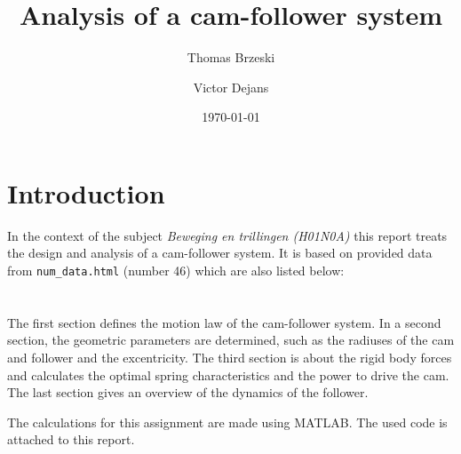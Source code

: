 \documentclass[a4paper]{article}
\date{\today}
\author{Thomas Brzeski \and  Victor Dejans}
\title{Analysis of a cam-follower system}
\begin{document}
\maketitle

\section*{Introduction}

In the context of the subject \textit{Beweging en trillingen (H01N0A)} this report treats the design and analysis of a cam-follower system. It is based on provided data from \texttt{num\_data.html} (number 46) which are also listed below:
\\

\\
\\



The first section defines the motion law of the cam-follower system. In a second section, the geometric parameters are determined, such as the radiuses of the cam and follower and the excentricity. The third section is about the rigid body forces and calculates the optimal spring characteristics and the power to drive the cam. The last section gives an overview of the dynamics of the follower.

The calculations for this assignment are made using MATLAB. The used code is attached to this report.
\end{document}
